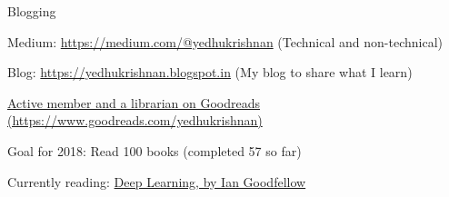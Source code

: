{}
\begin{cventries}
  \cventry
    {Blogging}%
    {}
    {}
    {}
    {
      \begin{cvitems}
        \item {Medium: \href{https://medium.com/@yedhukrishnan}{https://medium.com/@yedhukrishnan} (Technical and non-technical)}
        \item {Blog: \href{https://yedhukrishnan.blogspot.in}{https://yedhukrishnan.blogspot.in} (My blog to share what I learn)}
        \item {\href{https://www.goodreads.com/yedhukrishnan}{Active member and a librarian on Goodreads (https://www.goodreads.com/yedhukrishnan)}}
        \item {Goal for 2018: Read 100 books (completed 57 so far)}
        \item {Currently reading: \href{https://www.goodreads.com/book/show/30422361-deep-learning}{Deep Learning, by Ian Goodfellow}}
      \end{cvitems}
    }
\end{cventries}
